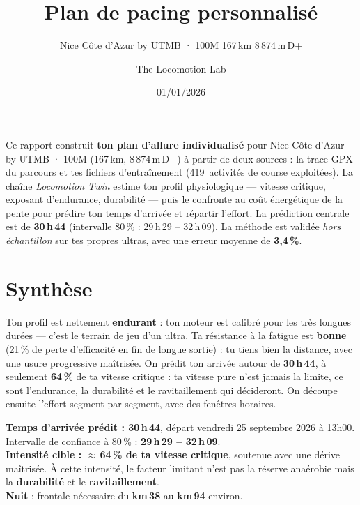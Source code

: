 \documentclass{locomotionreport}
\title{Plan de pacing personnalis\'e}
\subtitle{Nice Côte d'Azur by UTMB · 100M \textperiodcentered{} 167\,km \textperiodcentered{} 8\,874\,m\,D+}
\author{The Locomotion Lab}
\date{01/01/2026}
\begin{document}
\makecover

\begin{llabstract}
Ce rapport construit \textbf{ton plan d'allure individualis\'e} pour Nice Côte d'Azur by UTMB · 100M
(167\,km, 8\,874\,m\,D+) \`a partir de deux sources : la trace GPX du parcours et
tes fichiers d'entra\^inement (419~activit\'es de course exploit\'ees). La cha\^ine
\emph{Locomotion Twin} estime ton profil physiologique --- vitesse critique, exposant d'endurance,
durabilit\'e --- puis le confronte au co\^ut \'energ\'etique de la pente pour pr\'edire ton temps
d'arriv\'ee et r\'epartir l'effort. La pr\'ediction centrale est de \textbf{30\,h\,44}
(intervalle 80\,\% : 29\,h\,29 -- 32\,h\,09).
La m\'ethode est valid\'ee \emph{hors \'echantillon} sur tes propres ultras, avec une
erreur moyenne de \textbf{3,4\,\%}.
\end{llabstract}

\LLtoc
\clearpage

\section{Synth\`ese}

Ton profil est nettement \textbf{endurant} : ton moteur est calibré pour les très longues durées — c'est le terrain de jeu d'un ultra. Ta r\'esistance \`a la fatigue est \textbf{bonne} (21\,\% de perte d'efficacit\'e en fin de longue sortie) : tu tiens bien la distance, avec une usure progressive maîtrisée. On pr\'edit ton arriv\'ee autour de \textbf{30\,h\,44}, \`a seulement \textbf{64\,\%} de ta vitesse critique : ta vitesse pure n'est jamais la limite, ce sont l'endurance, la durabilit\'e et le ravitaillement qui d\'ecideront. On d\'ecoupe ensuite l'effort segment par segment, avec des fen\^etres horaires.

\begin{llnote}[L'essentiel]
\textbf{Temps d'arriv\'ee pr\'edit : 30\,h\,44}, d\'epart vendredi 25 septembre 2026 à 13h00.
Intervalle de confiance \`a 80\,\% : \textbf{29\,h\,29 -- 32\,h\,09}.
\\[2pt]
\textbf{Intensit\'e cible : $\approx$\,64\,\% de ta vitesse critique}, soutenue
avec une d\'erive ma\^itris\'ee. \`A cette intensit\'e, le facteur limitant n'est pas la
r\'eserve ana\'erobie mais la \textbf{durabilit\'e} et le \textbf{ravitaillement}.\\[2pt]
\textbf{Nuit} : frontale n\'ecessaire du \textbf{km\,38} au \textbf{km\,94} environ.\end{llnote}
\end{document}
